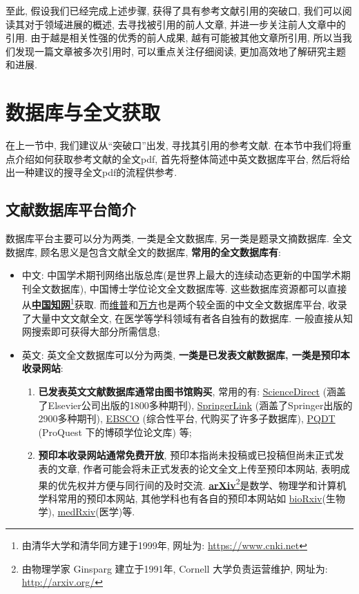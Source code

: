 \documentclass{formatBook}
\begin{document}
至此, 假设我们已经完成上述步骤, 获得了具有参考文献引用的突破口, 我们可以阅读其对于领域进展的概述, 去寻找被引用的前人文章, 并进一步关注前人文章中的引用. 由于越是相关性强的优秀的前人成果, 越有可能被其他文章所引用, 所以当我们发现一篇文章被多次引用时, 可以重点关注仔细阅读, 更加高效地了解研究主题和进展.

\section{数据库与全文获取}
在上一节中, 我们建议从``突破口''出发, 寻找其引用的参考文献. 在本节中我们将重点介绍如何获取参考文献的全文pdf, 首先将整体简述中英文数据库平台, 然后将给出一种建议的搜寻全文pdf的流程供参考.

\subsection{文献数据库平台简介}
数据库平台主要可以分为两类, 一类是全文数据库, 另一类是题录文摘数据库. 全文数据库, 顾名思义是包含文献全文的数据库, \textbf{常用的全文数据库有}:
\begin{itemize}
    \item 中文: 中国学术期刊网络出版总库(是世界上最大的连续动态更新的中国学术期刊全文数据库), 中国博士学位论文全文数据库等. 这些数据库资源都可以直接从\textbf{\href{https://www.cnki.net/}{中国知网}}\footnote{由清华大学和清华同方建于1999年, 网址为: \url{https://www.cnki.net}}获取. 而\href{http://www.cqvip.com/}{维普}和\href{https://new.wanfangdata.com.cn/index.html}{万方}也是两个较全面的中文全文数据库平台, 收录了大量中文文献全文, 在医学等学科领域有者各自独有的数据库. 一般直接从知网搜索即可获得大部分所需信息;
    \item 英文: 英文全文数据库可以分为两类, \textbf{一类是已发表文献数据库, 一类是预印本收录网站}:
          \begin{enumerate}
              \item \textbf{已发表英文文献数据库通常由图书馆购买}, 常用的有: \href{https://www.sciencedirect.com/}{ScienceDirect} (涵盖了Elsevier公司出版的1800多种期刊), \href{https://link.springer.com/}{SpringerLink} (涵盖了Springer出版的2900多种期刊), \href{https://www.ebsco.com}{EBSCO} (综合性平台, 代购买了许多子数据库), \href{http://www.pqdtcn.com/}{PQDT}
                    (ProQuest 下的博硕学位论文库) 等;
              \item \textbf{预印本收录网站通常免费开放}, 预印本指尚未投稿或已投稿但尚未正式发表的文章, 作者可能会将未正式发表的论文全文上传至预印本网站, 表明成果的优先权并方便与同行间的及时交流. \textbf{\href{http://arxiv.org/}{arXiv}}\footnote{由物理学家 Ginsparg 建立于1991年, Cornell 大学负责运营维护, 网址为: \url{http://arxiv.org/}}是数学、物理学和计算机学科常用的预印本网站, 其他学科也有各自的预印本网站如 \href{https://www.biorxiv.org/}{bioRxiv}(生物学), \href{https://www.medrxiv.org/}{medRxiv}(医学)等.
          \end{enumerate}
\end{itemize}
\end{document}
